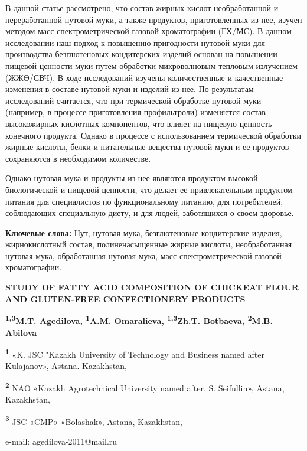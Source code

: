 В данной статье рассмотрено, что состав жирных кислот необработанной и
переработанной нутовой муки, а также продуктов, приготовленных из нее,
изучен методом масс-спектрометрической газовой хроматографии (ГХ/МС). В
данном исследовании наш подход к повышению пригодности нутовой муки для
производства безглютеновых кондитерских изделий основан на повышении
пищевой ценности муки путем обработки микроволновым тепловым излучением
(ЖЖӨ/СВЧ). В ходе исследований изучены количественные и качественные
изменения в составе нутовой муки и изделий из нее. По результатам
исследований считается, что при термической обработке нутовой муки
(например, в процессе приготовления профильтроли) изменяется состав
высокожирных кислотных компонентов, что влияет на пищевую ценность
конечного продукта. Однако в процессе с использованием термической
обработки жирные кислоты, белки и питательные вещества нутовой муки и ее
продуктов сохраняются в необходимом количестве.

Однако нутовая мука и продукты из нее являются продуктом высокой
биологической и пищевой ценности, что делает ее привлекательным
продуктом питания для специалистов по функциональному питанию, для
потребителей, соблюдающих специальную диету, и для людей, заботящихся о
своем здоровье.

{\bfseries Ключевые слова:} Нут, нутовая мука, безглютеновые кондитерские изделия,
жирнокислотный состав, полиненасыщенные жирные кислоты, необработанная
нутовая мука, обработанная нутовая мука, масс-спектрометрической газовой
хроматографии.
\begin{articleheader}

{\bfseries STUDY OF FATTY ACID COMPOSITION OF CHICKEAT FLOUR AND
GLUTEN-FREE CONFECTIONERY PRODUCTS}

{\bfseries \textsuperscript{1,3}M.T. Agedilova\textsuperscript{\envelope },
\textsuperscript{1}A.M. Omaralieva, \textsuperscript{1,3}Zh.T. Botbaeva,
\textsuperscript{2}M.B. Abilova}
\end{articleheader}
\begin{affiliation}
{\bfseries \textsuperscript{1}} «K. JSC "Kazakh University of Technology
and Business named after Kulajanov», Astana. Kazakhstan,

{\bfseries \textsuperscript{2}} NAO «Kazakh Agrotechnical University named after. S. Seifullin»,
Astana, Kazakhstan,

{\bfseries \textsuperscript{3}}  JSC «CMP» «Bolashak», Astana, Kazakhstan,

e-mail: agedilova-2011@mail.ru
\end{affiliation}

